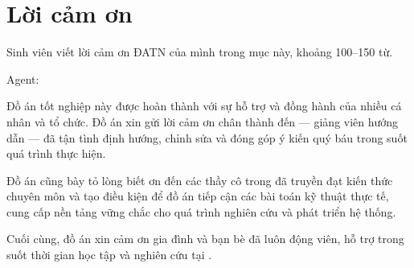 \chapter*{Lời cảm ơn}

Sinh viên viết lời cảm ơn ĐATN của mình trong mục này, khoảng 100--150 từ.

Agent:

Đồ án tốt nghiệp này được hoàn thành với sự hỗ trợ và đồng hành của nhiều cá nhân và tổ chức.
Đồ án xin gửi lời cảm ơn chân thành đến \supervisor{} --- giảng viên hướng dẫn --- đã tận tình
định hướng, chỉnh sửa và đóng góp ý kiến quý báu trong suốt quá trình thực hiện.

Đồ án cũng bày tỏ lòng biết ơn đến các thầy cô trong \school{} đã truyền đạt kiến thức chuyên
môn và tạo điều kiện để đồ án tiếp cận các bài toán kỹ thuật thực tế, cung cấp nền tảng vững
chắc cho quá trình nghiên cứu và phát triển hệ thống.

Cuối cùng, đồ án xin cảm ơn gia đình và bạn bè đã luôn động viên, hỗ trợ trong suốt thời gian
học tập và nghiên cứu tại \university{}.
